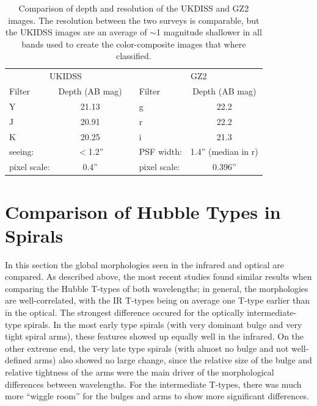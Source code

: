 \begin{center}
\begin{table}
\begin{tabular}{lcclc}
\hline \hline
\multicolumn{2}{c}{UKIDSS} & & \multicolumn{2}{c}{GZ2} \\
\cline{1-2}\cline{4-5}
Filter & Depth (AB mag) & & Filter & Depth (AB mag) \\

Y      & 21.13 & & g      & 22.2 \\
J      & 20.91 & & r      & 22.2 \\
K      & 20.25  & & i      & 21.3 \\
\cline{1-2}\cline{4-5}
seeing: & $<$1.2'' & & PSF width: & 1.4'' (median in r) \\
pixel scale: & 0.4'' & & pixel scale: & 0.396'' \\
\hline \hline
\end{tabular}
\caption{Comparison of depth and resolution of the UKDISS and GZ2 images. The resolution between the two surveys is comparable, but the UKIDSS images are an average of $\sim$1 magnitude shallower in all bands used to create the color-composite images that where classified. }
\label{tab:uk_gz2_instrumentation}
\end{table}
\end{center}

\section{Comparison of Hubble Types in Spirals}
In this section the global morphologies seen in the infrared and optical are compared. As described above, the most recent studies found similar results when comparing the Hubble T-types of both wavelengths; in general, the morphologies are well-correlated, with the IR T-types being on average one T-type earlier than in the optical. The strongest difference occured for the optically intermediate-type spirals. In the most early type spirals (with very dominant bulge and very tight spiral arms), these features showed up equally well in the infrared. On the other extreme end, the very late type spirals (with almost no bulge and not well-defined arms) also showed no large change, since the relative size of the bulge and relative tightness of the arms were the main driver of the morphological differences between wavelengths. For the intermediate T-types, there was much more ``wiggle room'' for the bulges and arms to show more significant differences. 

